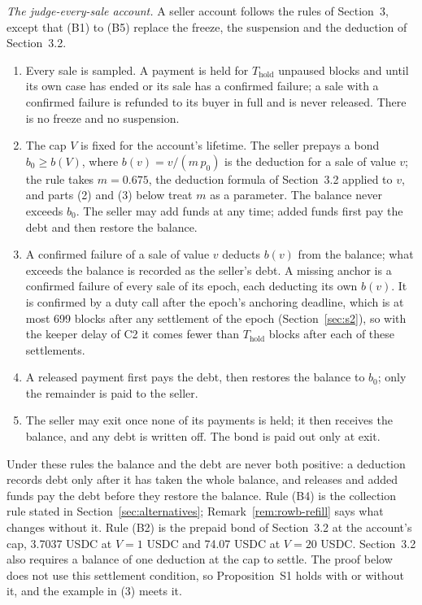 \documentclass[10pt,a4paper]{article}
\newcommand{\Thold}{T_{\mathrm{hold}}}
\theoremstyle{plain}
\theoremstyle{remark}
\begin{document}
\emph{The judge-every-sale account.} A seller account follows the rules of Section~3, except that (B1) to (B5) replace the freeze, the suspension and the deduction of Section~3.2.
\begin{enumerate}[label=(B\arabic*),leftmargin=2.6em]
\item Every sale is sampled. A payment is held for $\Thold$ unpaused blocks and until its own case has ended or its sale has a confirmed failure; a sale with a confirmed failure is refunded to its buyer in full and is never released. There is no freeze and no suspension.
\item The cap $V$ is fixed for the account's lifetime. The seller prepays a bond $b_0\ge b(V)$, where $b(v)=v/(m\,p_0)$ is the deduction for a sale of value $v$; the rule takes $m=0.675$, the deduction formula of Section~3.2 applied to $v$, and parts (2) and (3) below treat $m$ as a parameter. The balance never exceeds $b_0$. The seller may add funds at any time; added funds first pay the debt and then restore the balance.
\item A confirmed failure of a sale of value $v$ deducts $b(v)$ from the balance; what exceeds the balance is recorded as the seller's debt. A missing anchor is a confirmed failure of every sale of its epoch, each deducting its own $b(v)$. It is confirmed by a duty call after the epoch's anchoring deadline, which is at most 699 blocks after any settlement of the epoch (Section~\ref{sec:s2}), so with the keeper delay of C2 it comes fewer than $\Thold$ blocks after each of these settlements.
\item A released payment first pays the debt, then restores the balance to $b_0$; only the remainder is paid to the seller.
\item The seller may exit once none of its payments is held; it then receives the balance, and any debt is written off. The bond is paid out only at exit.
\end{enumerate}
Under these rules the balance and the debt are never both positive: a deduction records debt only after it has taken the whole balance, and releases and added funds pay the debt before they restore the balance. Rule (B4) is the collection rule stated in Section~\ref{sec:alternatives}; Remark~\ref{rem:rowb-refill} says what changes without it. Rule (B2) is the prepaid bond of Section~3.2 at the account's cap, 3.7037 USDC at $V=1$ USDC and 74.07 USDC at $V=20$ USDC. Section~3.2 also requires a balance of one deduction at the cap to settle. The proof below does not use this settlement condition, so Proposition~S1 holds with or without it, and the example in (3) meets it.
\end{document}
